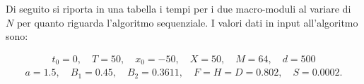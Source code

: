 \noindent Di seguito si riporta in una tabella i tempi per i due macro-moduli al variare di $N$ per quanto riguarda l'algoritmo sequenziale. I valori dati in input all'algoritmo sono:

\begin{align}
        t_0=0,\quad T = 50,\quad x_0 = -50,\quad X=50,\quad M = 64, \quad d = 500
        \label{eq:init-parameters}
\end{align}
\begin{align*}
        a = 1.5,\quad B_1 = 0.45,\quad B_2 = 0.3611,\quad F = H = D = 0.802,\quad S = 0.0002.
\end{align*}



